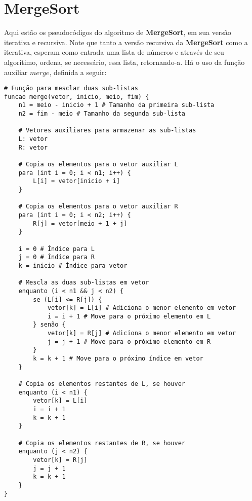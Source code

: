 \section{MergeSort}
Aqui estão os pseudocódigos do algoritmo de \textbf{MergeSort}, em sua versão iterativa e recursiva. Note que tanto a versão recursiva da \textbf{MergeSort} como a iterativa, esperam como entrada uma lista de números e através de seu algoritimo, ordena, se necessário, essa lista, retornando-a. Há o uso da função auxiliar $merge$, definida a seguir:
\begin{verbatim}
# Função para mesclar duas sub-listas
funcao merge(vetor, inicio, meio, fim) {
    n1 = meio - inicio + 1 # Tamanho da primeira sub-lista
    n2 = fim - meio # Tamanho da segunda sub-lista

    # Vetores auxiliares para armazenar as sub-listas
    L: vetor
    R: vetor

    # Copia os elementos para o vetor auxiliar L
    para (int i = 0; i < n1; i++) {
        L[i] = vetor[inicio + i]
    }

    # Copia os elementos para o vetor auxiliar R
    para (int i = 0; i < n2; i++) {
        R[j] = vetor[meio + 1 + j]
    }

    i = 0 # Índice para L
    j = 0 # Índice para R
    k = inicio # Índice para vetor

    # Mescla as duas sub-listas em vetor
    enquanto (i < n1 && j < n2) {
        se (L[i] <= R[j]) {
            vetor[k] = L[i] # Adiciona o menor elemento em vetor
            i = i + 1 # Move para o próximo elemento em L
        } senão {
            vetor[k] = R[j] # Adiciona o menor elemento em vetor
            j = j + 1 # Move para o próximo elemento em R
        }
        k = k + 1 # Move para o próximo índice em vetor
    }

    # Copia os elementos restantes de L, se houver
    enquanto (i < n1) {
        vetor[k] = L[i]
        i = i + 1
        k = k + 1
    }

    # Copia os elementos restantes de R, se houver
    enquanto (j < n2) {
        vetor[k] = R[j]
        j = j + 1
        k = k + 1
    }
}
\end{verbatim}

 

 
 

